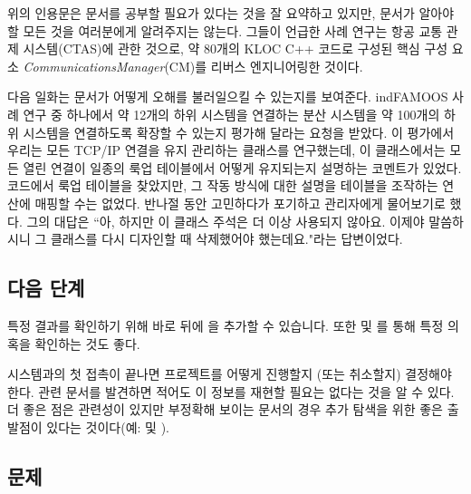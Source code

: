 \documentclass[a4paper,10pt,twoside]{book}
\begin{document}
위의 인용문은 문서를 공부할 필요가 있다는 것을 잘 요약하고 있지만, 문서가 알아야 할 모든 것을 여러분에게 알려주지는 않는다. 그들이 언급한 사례 연구는 항공 교통 관제 시스템(CTAS)에 관한 것으로, 약 80개의 KLOC C++ 코드로 구성된 핵심 구성 요소 \emph{Communications\-Manager}(CM)를 리버스 엔지니어링한 것이다.

다음 일화는 문서가 어떻게 오해를 불러일으킬 수 있는지를 보여준다. ind{FAMOOS} 사례 연구 중 하나에서 약 12개의 하위 시스템을 연결하는 분산 시스템을 약 100개의 하위 시스템을 연결하도록 확장할 수 있는지 평가해 달라는 요청을 받았다. 이 평가에서 우리는 모든 TCP/IP 연결을 유지 관리하는 클래스를 연구했는데, 이 클래스에서는 모든 열린 연결이 일종의 룩업 테이블에서 어떻게 유지되는지 설명하는 코멘트가 있었다. 코드에서 룩업 테이블을 찾았지만, 그 작동 방식에 대한 설명을 테이블을 조작하는 연산에 매핑할 수는 없었다. 반나절 동안 고민하다가 포기하고 관리자에게 물어보기로 했다. 그의 대답은 ``아, 하지만 이 클래스 주석은 더 이상 사용되지 않아요. 이제야 말씀하시니 그 클래스를 다시 디자인할 때 삭제했어야 했는데요."라는 답변이었다.

\subsection*{다음 단계}

특정 결과를 확인하기 위해  바로 뒤에 을 추가할 수 있습니다. 또한  및 를 통해 특정 의혹을 확인하는 것도 좋다.

시스템과의 첫 접촉이 끝나면 프로젝트를 어떻게 진행할지 (또는 취소할지) 결정해야 한다. 관련 문서를 발견하면 적어도 이 정보를 재현할 필요는 없다는 것을 알 수 있다. 더 좋은 점은 관련성이 있지만 부정확해 보이는 문서의 경우 추가 탐색을 위한 좋은 출발점이 있다는 것이다(예:  및 ).



\subsection*{문제}
\end{document}
